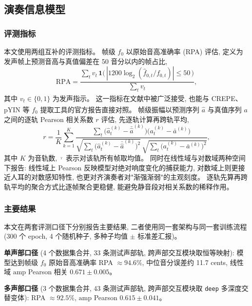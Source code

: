\documentclass[a4paper, UTF8, zihao=-4, fontset=fandol]{ctexart}
\newcommand{\upcite}[1]{\textsuperscript{\cite{#1}}}
\begin{document}
\subsection{演奏信息模型}

\subsubsection{评测指标}

本文使用两组互补的评测指标。 帧级 $f_0$ 以原始音高准确率 (RPA) 评估, 定义为发声帧上预测音高与真值偏差在 50 音分以内的帧占比,
\begin{equation}\label{eq:rpa}
\mathrm{RPA} = \frac{\sum_t v_t \, \mathbf{1}\!\big(\,|1200 \log_2(\hat f_{0,t} / f_{0,t})| \le 50 \,\big)}{\sum_t v_t},
\end{equation}
其中 $v_t \in \{0, 1\}$ 为发声指示。 这一指标在文献中被广泛接受, 也能与 CREPE\upcite{crepe}、pYIN\upcite{mauchdixon} 等 $f_0$ 提取工具的官方报告直接对照。 帧级振幅以预测序列 $\hat a$ 与真值序列 $a$ 之间的逐轨 Pearson 相关系数 $r$ 评估, 先逐轨计算再跨轨平均,
\begin{equation}\label{eq:pearson}
r = \frac{1}{K} \sum_{k=1}^{K} \frac{\sum_t \big(\hat a^{(k)}_t - \bar{\hat a}^{(k)}\big)\big(a^{(k)}_t - \bar a^{(k)}\big)}{\sqrt{\sum_t \big(\hat a^{(k)}_t - \bar{\hat a}^{(k)}\big)^2} \, \sqrt{\sum_t \big(a^{(k)}_t - \bar a^{(k)}\big)^2}},
\end{equation}
其中 $K$ 为音轨数, $\bar{\cdot}$ 表示对该轨所有帧取均值。 同时在线性域与对数域两种空间下报告: 线性域上 Pearson 反映模型对绝对响度变化的捕获能力, 对数域上则更接近人耳的对数感知特性, 也更对齐演奏者对"渐强渐弱"的主观刻度。 逐轨先算再跨轨平均的聚合方式比逐帧聚合更稳健, 能避免静音段对相关系数的稀释作用。

\subsubsection{主要结果}

本文在两套评测口径下分别报告主要结果, 二者使用同一套架构与同一套训练流程 (300 个 epoch, 4 个随机种子, 多种子均值 $\pm$ 标准差汇报)。

\textbf{单声部口径} (4 个数据集合并, 33 条测试声部轨, 跨声部交互模块取恒等映射): 模型达到帧级 $f_0$ 原始音高准确率 RPA $\approx \mathbf{94.6\%}$, 中位音分误差约 11.7 cents, 线性域 $\mathrm{amp}$ Pearson 相关 $\mathbf{0.671 \pm 0.005}$。

\textbf{多声部口径} (3 个数据集合并, 43 条测试声部轨, 跨声部交互模块取 \texttt{deep} 多深度交替变体): RPA $\approx \mathbf{92.5\%}$, $\mathrm{amp}$ Pearson $\mathbf{0.615 \pm 0.041}$。
\end{document}
